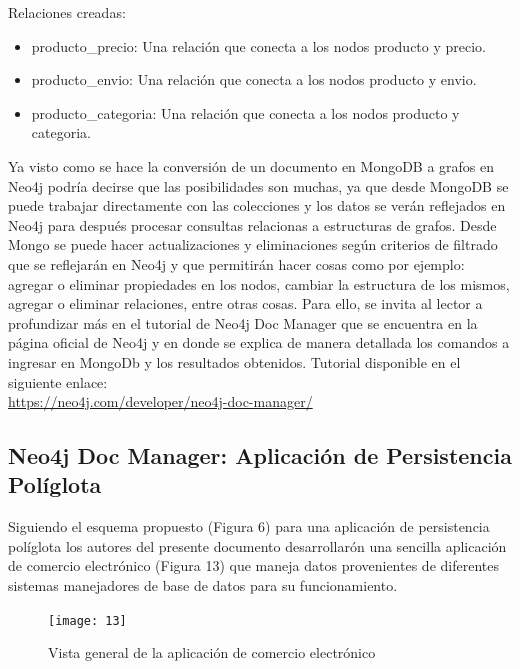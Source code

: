 \documentclass[conference]{IEEEtran}
\begin{document}
Relaciones creadas:\\

\begin{itemize}
\item producto\_precio: Una relaci\'on que conecta a los nodos producto y precio.
\item producto\_envio: Una relaci\'on que conecta a los nodos producto y envio.
\item producto\_categoria: Una relaci\'on que conecta a los nodos producto y categoria.\\
\end{itemize}

Ya visto como se hace la conversi\'on de un documento en MongoDB a grafos en Neo4j podr\'ia decirse que las posibilidades son muchas, ya que desde MongoDB se puede trabajar directamente con las colecciones y los datos se ver\'an reflejados en Neo4j para despu\'es procesar consultas relacionas a estructuras de grafos. Desde Mongo se puede hacer actualizaciones y eliminaciones  seg\'un criterios de filtrado que se reflejar\'an en Neo4j y que permitir\'an hacer cosas como por ejemplo: agregar o eliminar propiedades en los nodos, cambiar la estructura de los mismos, agregar o eliminar relaciones, entre otras cosas. Para ello, se invita al lector a profundizar m\'as en el tutorial de Neo4j Doc Manager que se encuentra en la p\'agina oficial de Neo4j  y en donde se explica de manera detallada los comandos a ingresar en MongoDb y los resultados obtenidos. Tutorial disponible en el siguiente enlace:\\
\url{https://neo4j.com/developer/neo4j-doc-manager/}

\subsection*{Neo4j Doc Manager: Aplicaci\'on de Persistencia Pol\'iglota}

Siguiendo el esquema propuesto (Figura 6) para una aplicaci\'on de persistencia pol\'iglota  los autores del presente documento desarrollar\'on una sencilla aplicaci\'on de comercio electr\'onico (Figura 13) que maneja datos provenientes de diferentes sistemas manejadores de base de datos para su funcionamiento.

\begin{figure}[!h]
\centering
\texttt{[image: 13]}
\caption{Vista general de la aplicaci\'on de comercio electr\'onico}
\label{}
\end{figure}
\end{document}
